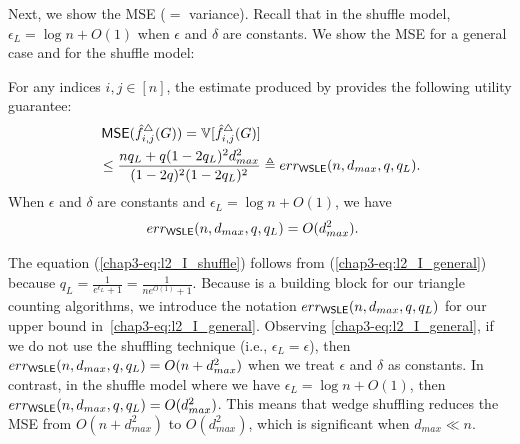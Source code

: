 Next,
we show the MSE ($=$ variance). 
Recall that in the shuffle model, $\epsilon_L = \log n + O(1)$ when $\epsilon$ and $\delta$ are constants.
We show
the MSE for a general case and for the shuffle model:
\begin{theorem}
\label{chap3-thm:l2-loss_I}
  For any indices $i,j \in [n]$, the estimate produced by
  \AlgWSLE{} provides the following utility guarantee:
\begin{align}
& \operatorname{\textsf{MSE}}(\hat{f}_{i,j}^\triangle(G)) = \operatorname{\mathbb{V}}[\hat{f}_{i,j}^\triangle(G)] \nonumber\\
  & \leq \frac{n q_L + q(1-2q_L)^2 d_{max}^2}{(1-2q)^2(1-2q_L)^2} \triangleq
  err_{\textsf{WSLE}}(n,d_{max},q,q_L).
\label{chap3-eq:l2_I_general}
\end{align}
  When $\epsilon$ and $\delta$ are constants and $\epsilon_L = \log n + O(1)$, we
  have
\begin{align}
  & err_{\textsf{WSLE}{}}(n,d_{max}, q, q_L) = O(d_{max}^2).
\label{chap3-eq:l2_I_shuffle}
\end{align}
\end{theorem}
The equation (\ref{chap3-eq:l2_I_shuffle}) follows from (\ref{chap3-eq:l2_I_general}) because $q_L = \frac{1}{e^{\epsilon_L}+1} = \frac{1}{n e^{O(1)} + 1}$. 
Because \AlgWSLE{} is a building block for our triangle counting algorithms, we
introduce the notation $err_{\textsf{WSLE}{}}(n,d_{max}, q, q_L)$ for our upper bound
in~\eqref{chap3-eq:l2_I_general}. Observing
\eqref{chap3-eq:l2_I_general}, if we do not use the shuffling technique (i.e.,
$\epsilon_L = \epsilon$), then $err_{\textsf{WSLE}{}}(n,d_{max}, q, q_L) = O(n + d_{max}^2)$ when we
treat $\epsilon$ and $\delta$ as constants.
In contrast, in the shuffle model where we have $\epsilon_L = \log n + O(1)$,
then $err_{\textsf{WSLE}{}}(n,d_{max}, q, q_L) = O(d_{max}^2)$.
This means that wedge shuffling reduces the MSE from $O(n + d_{max}^2)$ to $O(d_{max}^2)$, which is significant when $d_{max} \ll n$.

